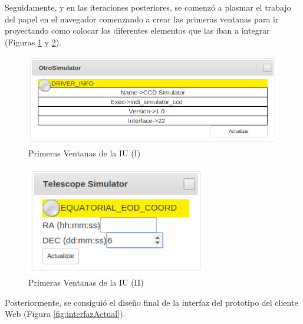 Seguidamente, y en las iteraciones posteriores, se comenzó a plasmar el trabajo del papel en el navegador comenzando a crear las primeras ventanas para ir proyectando como colocar los diferentes elementos que las iban a integrar (Figuras \ref{fig:primerasVentanas1} y \ref{fig:primerasVentanas2}).

\begin{figure}[htb]
\centering
\includegraphics[width=1\textwidth]{./imagenes/primerasVentanas1}
\caption{Primeras Ventanas de la IU (I)} \label{fig:primerasVentanas1}
\end{figure}

\begin{figure}[htb]
\centering
\includegraphics[width=0.7\textwidth]{./imagenes/primerasVentanas2}
\caption{Primeras Ventanas de la IU (II)} \label{fig:primerasVentanas2}
\end{figure}

Posteriormente, se consiguió el diseño final de la interfaz del prototipo del cliente Web (Figura \ref{fig:interfazActual}).\\ \\

